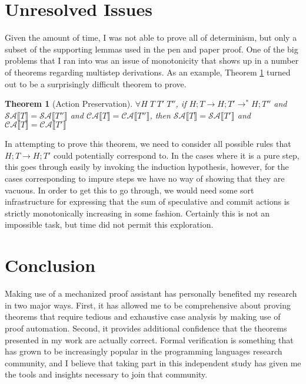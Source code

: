 \documentclass[11pt]{article}
\newtheorem{theorem}{Theorem}
\newcommand{\specActions}[1]{\mathcal{SA} \llbracket #1 \rrbracket}
\newcommand{\commitActions}[1]{\mathcal{CA} \llbracket #1 \rrbracket}
\begin{document}
\section{Unresolved Issues}
Given the amount of time, I was not able to prove all of determinism, but only a subset of the supporting lemmas used in the pen and paper proof.  One of the big problems that I ran into was an issue of monotonicity that shows up in a number of theorems regarding multistep derivations.  As an example, Theorem \ref{actionPres} turned out to be a surprisingly difficult theorem to prove.

\begin{theorem}[Action Preservation]
\label{actionPres}
$\forall H \;T \;T'\; T''$, if $H; T \rightarrow H; T' \rightarrow^* H; T''$ and \\$\specActions{T} = \specActions{T''}$ and $\commitActions{T} = \commitActions{T''}$, then $\specActions{T} = \specActions{T'}$ and $\commitActions{T} = \commitActions{T'}$
\end{theorem}

In attempting to prove this theorem, we need to consider all possible rules that $H; T \rightarrow H; T'$ could potentially correspond to.  In the cases where it is a pure step, this goes through easily by invoking the induction hypothesis, however, for the cases corresponding to impure steps we have no way of showing that they are vacuous.  In order to get this to go through, we would need some sort infrastructure for expressing that the sum of speculative and commit actions is strictly monotonically increasing in some fashion.  Certainly this is not an impossible task, but time did not permit this exploration.

\section{Conclusion}
Making use of a mechanized proof assistant has personally benefited my research in two major ways.  First, it has allowed me to be comprehensive about proving theorems that require tedious and exhaustive case analysis by making use of proof automation.  Second, it provides additional confidence that the theorems presented in my work are actually correct.  Formal verification is something that has grown to be increasingly popular in the programming languages research community, and I believe that taking part in this independent study has given me the tools and insights necessary to join that community.  






\end{document}
